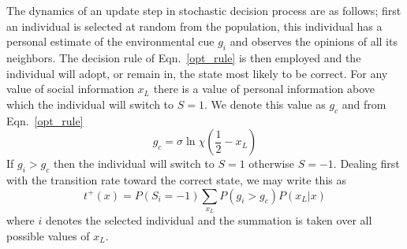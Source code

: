 \documentclass[aps,prl,twocolumn,showpacs,superscriptaddress,groupedaddress]{revtex4}
\begin{document}
The dynamics of an update step in stochastic decision process are as follows; first an individual is selected at random from the population, this individual has a personal estimate of the environmental cue $g_i$ and observes the opinions of all its neighbors. The decision rule of Eqn.~\ref{opt_rule} is then employed and the individual will adopt, or remain in, the state most likely to be correct.
For any value of social information $x_L$ there is a value of personal information above which the individual will switch to $S=1$. We denote this value as $g_c$ and from Eqn.~\ref{opt_rule} 
\begin{equation}
g_c  = \sigma\ln\chi  \left(\frac{1}{2}-x_L\right) 
\end{equation}
If $g_i>g_c$ then the individual will switch to $S=1$ otherwise $S=-1$. 
Dealing first with the transition rate toward the correct state, we may write this as
\begin{equation}
t^+(x) = P(S_i=-1)\sum_{x_{L}}P\left(g_i>g_c \right)P\left(x_{L}|x\right)
\label{up}
\end{equation}
where $i$ denotes the selected individual and the summation is taken over all possible values of $x_{L}$. 
\end{document}
